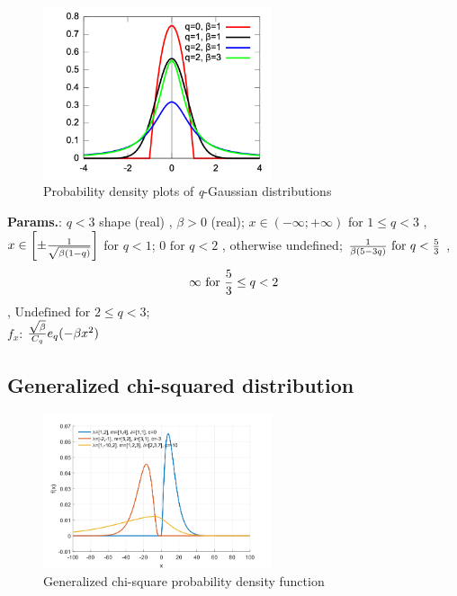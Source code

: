     \begin{figure}[H]
        \centering
        \includegraphics[width=0.6\textwidth]{images/The PDF of QGaussian.png}
        \caption{Probability density plots of \textit{q}-Gaussian distributions}
    \end{figure}




    {\color{darkblue} \textbf{Params.}:} {$q < 3 $ shape (real) ,  $ \beta > 0 $ (real)}; {$x \in (-\infty; +\infty)\!$ for $1\le q < 3 $ ,  $x \in \left[\pm {1 \over \sqrt{\beta(1-q)}}\right] $ for $q < 1 $}; {$0\text{ for }q<2$ , otherwise undefined}; {$ { 1 \over {\beta (5-3q)}} \text{ for } q < {5 \over 3}$ ,  $$\infty \text{ for } {5 \over 3} \le q < 2$$ ,  $ \text{Undefined for }2 \le q <3$};\hspace{0.5cm}\\{\color{darkblue} \textbf{$f_x$}:} {${\sqrt{\beta} \over C_q} e_q({-\beta x^2}) $}



    
        
\subsection{Generalized chi-squared distribution}


    \begin{figure}[H]
        \centering
        \includegraphics[width=0.6\textwidth]{images/Generalized chi-square PDF.png}
        \caption{Generalized chi-square probability density function}
    \end{figure}




